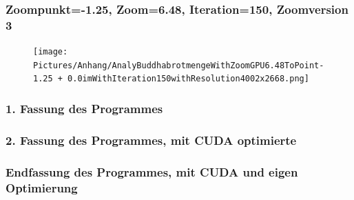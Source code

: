 \subsubsection*{Zoompunkt=-1.25, Zoom=6.48, Iteration=150, Zoomversion 3}
\begin{figure}[H]
    \centering
    \texttt{[image: Pictures/Anhang/AnalyBuddhabrotmengeWithZoomGPU6.48ToPoint-1.25 + 0.0imWithIteration150withResolution4002x2668.png]}
    \label{fig:Version3}
\end{figure}
\bigskip

\subsubsection*{1. Fassung des Programmes}
\bigskip
\subsubsection*{2. Fassung des Programmes, mit CUDA optimierte}
\bigskip
\subsubsection*{Endfassung des Programmes, mit CUDA und eigen Optimierung}
